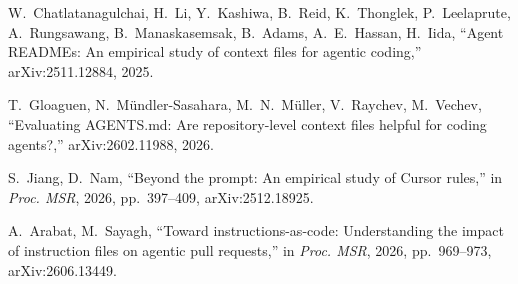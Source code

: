 W.~Chatlatanagulchai, H.~Li, Y.~Kashiwa, B.~Reid, K.~Thonglek, P.~Leelaprute, A.~Rungsawang, B.~Manaskasemsak, B.~Adams, A.~E.~Hassan, H.~Iida, ``Agent {READMEs}: An empirical study of context files for agentic coding,'' arXiv:2511.12884, 2025.

T.~Gloaguen, N.~M\"undler-Sasahara, M.~N.~M\"uller, V.~Raychev, M.~Vechev, ``Evaluating {AGENTS.md}: Are repository-level context files helpful for coding agents?,'' arXiv:2602.11988, 2026.

S.~Jiang, D.~Nam, ``Beyond the prompt: An empirical study of Cursor rules,'' in \emph{Proc. MSR}, 2026, pp.~397--409, arXiv:2512.18925.

A.~Arabat, M.~Sayagh, ``Toward instructions-as-code: Understanding the impact of instruction files on agentic pull requests,'' in \emph{Proc. MSR}, 2026, pp.~969--973, arXiv:2606.13449.
